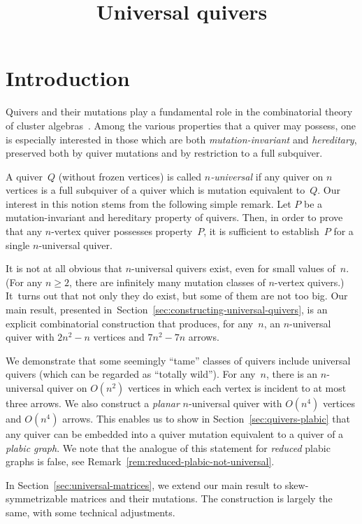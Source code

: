 \documentclass[ALCO,ThmDefs,Unicode,epreuves,published]{cedram}
\author{\firstname{Sergey} \lastname{Fomin}}
\author
{\firstname{Kiyoshi} \lastname{Igusa}}
\author
{\firstname{Kyungyong} \lastname{Lee}}
\title[Universal quivers]{Universal quivers}
\begin{document}
\maketitle

\section{Introduction}




Quivers and their mutations play a fundamental role in the combinatorial theory of cluster algebras~\cite{FWZ, ca1}. Among the various properties that a quiver may possess, one is especially interested in those which are both \emph{mutation-invariant} and \emph{hereditary}, \ie preserved both by quiver mutations and by restriction to a full subquiver. 

A quiver~$Q$ (without frozen vertices) is called 
\emph{$n$-universal} if any quiver on $n$ vertices is a full subquiver of a quiver which is mutation equivalent to~$Q$. 
Our interest in this notion stems from the following simple remark. Let $P$ be a mutation-invariant and hereditary property of quivers. Then, in order to prove that any $n$-vertex quiver possesses property~$P$, it is sufficient to establish~$P$ for a single $n$-universal quiver. 

It is not at all obvious that $n$-universal quivers exist, even for small values of~$n$. 
(For any $n\ge 2$, there are infinitely many mutation classes of $n$-vertex quivers.) 
It~turns out that not only they do exist, but some of them are not too big. 
Our main result, presented in~Section~\ref{sec:constructing-universal-quivers}, is an explicit combinatorial construction that produces, for any~$n$, an $n$-universal quiver with $2n^2-n$ vertices and $7n^2-7n$ arrows. 

We demonstrate that some seemingly ``tame'' classes of quivers include universal quivers (which can be regarded as ``totally wild''). 
For any~$n$, there is an $n$-universal quiver on $O(n^2)$ vertices in which each vertex is incident to at most three arrows. 
We also construct a \emph{planar} $n$-universal quiver with $O(n^4)$ vertices and $O(n^4)$ arrows. 
This enables us to show in Section~\ref{sec:quivers-plabic} that any quiver can be embedded 
into a quiver mutation equivalent to a quiver of a \emph{plabic graph}. 
We note that the analogue of this statement for \emph{reduced} plabic graphs is false, 
see Remark~\ref{rem:reduced-plabic-not-universal}. 

In Section~\ref{sec:universal-matrices}, we extend our main result to skew-symmetrizable matrices and their mutations. The construction is largely the same, with some technical adjustments. 
\end{document}
